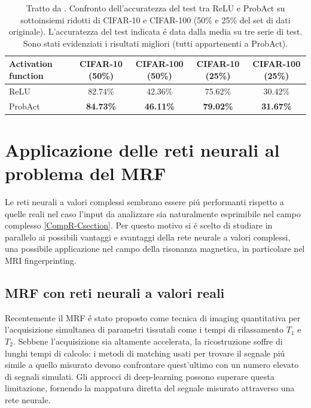 \documentclass[a4paper,12pt]{report}
\begin{document}
  \begin{table}[h]\caption{Tratto da \cite{lee2019probact}. Confronto dell'accuratezza del test tra ReLU e ProbAct su sottoinsiemi ridotti di CIFAR-10 e CIFAR-100 (50\% e 25\% del set di dati originale). L'accuratezza del test indicata \'e data dalla media su tre serie di test. Sono stati evidenziati i risultati migliori (tutti appartenenti a ProbAct).} \label{PartialDatasetTab}
   \centering
   \begin{tabular}[h]{|l|c|c|c|c|}
    \hline
    Activation function & CIFAR-10 (50\%) & CIFAR-100 (50\%) & CIFAR-10 (25\%) & CIFAR-100 (25\%) \\ \hline
    ReLU & 82.74\% & 42.36\% & 75.62\% & 30.42\% \\ 
    ProbAct & \textbf{84.73\%} & \textbf{46.11\%} & \textbf{79.02\%} & \textbf{31.67\%} \\ \hline
   \end{tabular}
  \end{table}
 
 
 \chapter{Applicazione delle reti neurali al problema del MRF}\label{MRIsection}
 
 Le reti neurali a valori complessi sembrano essere pi\'u performanti rispetto a quelle reali nel caso l'input da analizzare sia naturalmente esprimibile nel campo complesso \ref{CompR-Csection}. 
 Per questo motivo si \'e scelto di studiare in parallelo ai possibili vantaggi e svantaggi della rete neurale a valori complessi, una possibile applicazione nel campo della risonanza magnetica, in particolare nel MRI fingerprinting.
 
 \section{MRF con reti neurali a valori reali}
 
 Recentemente il MRF \'e stato proposto come tecnica di imaging quantitativa per l'acquisizione simultanea di parametri tissutali come i tempi di rilassamento $T_1$ e $T_2$. 
 Sebbene l'acquisizione sia altamente accelerata, la ricostruzione soffre di lunghi tempi di calcolo: i metodi di matching usati per trovare il segnale pi\'u simile a quello misurato devono confrontare quest'ultimo con un numero elevato di segnali simulati. 
 Gli approcci di deep-learning possono superare questa limitazione, fornendo la mappatura diretta del segnale misurato attraverso una rete neurale. 
 
\end{document}
